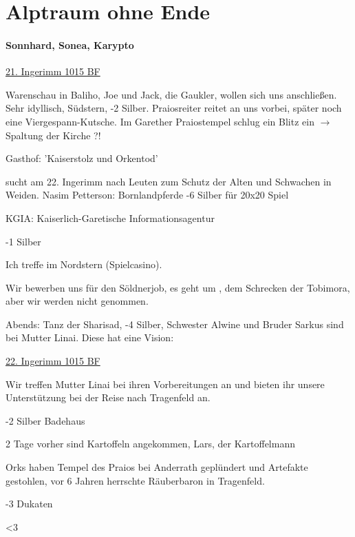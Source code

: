 \section{Alptraum ohne Ende}
\paragraph{Sonnhard, Sonea, Karypto}
\underline{21. Ingerimm 1015 BF}

Warenschau in Baliho, Joe und Jack, die Gaukler, wollen sich uns anschließen.
Sehr idyllisch, Südstern, -2 Silber.
Praiosreiter reitet an uns vorbei, später noch eine Viergespann-Kutsche. Im Garether Praiostempel schlug ein Blitz ein $\rightarrow$ Spaltung der Kirche ?!

Gasthof: 'Kaiserstolz und Orkentod'

 sucht am 22. Ingerimm nach Leuten zum Schutz der Alten und Schwachen in Weiden. 
Nasim Petterson: Bornlandpferde
-6 Silber für 20x20 Spiel

KGIA: Kaiserlich-Garetische Informationsagentur
 
-1 Silber 

Ich treffe  im Nordstern (Spielcasino).

Wir bewerben uns für den Söldnerjob, es geht um , dem Schrecken der Tobimora, aber wir werden nicht genommen. 

Abends: Tanz der Sharisad, -4 Silber, Schwester Alwine und Bruder Sarkus sind bei Mutter Linai. Diese hat eine Vision: 
\begin{figure}[htb!]
\centering
{}
\end{figure}

\underline{22. Ingerimm 1015 BF}

Wir treffen Mutter Linai bei ihren Vorbereitungen an und bieten ihr unsere Unterstützung bei der Reise nach Tragenfeld an. 

-2 Silber Badehaus

2 Tage vorher sind Kartoffeln angekommen, Lars, der Kartoffelmann

Orks haben Tempel des Praios bei Anderrath geplündert und Artefakte gestohlen, vor 6 Jahren herrschte Räuberbaron in Tragenfeld.

-3 Dukaten

<3